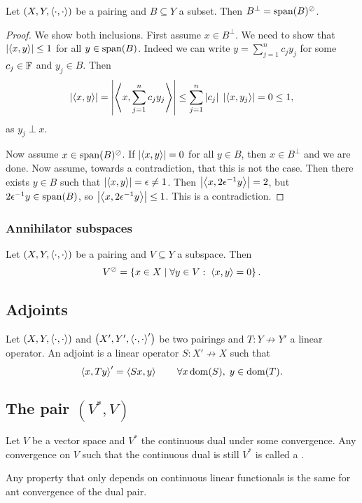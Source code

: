 \begin{proposition}
Let $\left( X,Y,\left\langle \cdot,\cdot \right\rangle \right)$ be a pairing and $B\subseteq Y$ a subset. Then $B^\perp = \operatorname{span}(B)^\oslash$.
\end{proposition}
\begin{proof}
We show both inclusions. First assume $x\in B^\perp$. We need to show that $\left|\left\langle x,y \right\rangle\right| \leq 1$ for all $y\in \operatorname{span}(B)$. Indeed we can write $y = \sum_{j=1}^n c_jy_j$ for some $c_j\in\mathbb{F}$ and $y_j\in B$. Then
\[ \left|\left\langle x,y \right\rangle\right| = \left|\left\langle x, \sum_{j=1}^n c_jy_j \right\rangle\right| \leq \sum_{j=1}^n |c_j|\;\left|\left\langle x, y_j \right\rangle\right| = 0 \leq 1, \]
as $y_j\perp x$.

Now assume $x\in \operatorname{span}(B)^\oslash$. If $\left|\left\langle x,y \right\rangle\right| = 0$ for all $y\in B$, then $x\in B^\perp$ and we are done. Now assume, towards a contradiction, that this is not the case. Then there exists $y\in B$ such that $\left|\left\langle x,y \right\rangle\right| = \epsilon \neq 1$. Then $\left|\left\langle x,2\epsilon^{-1}y \right\rangle\right| = 2$, but $2\epsilon^{-1}y\in\operatorname{span}(B)$, so $\left|\left\langle x,2\epsilon^{-1}y \right\rangle\right| \leq 1$. This is a contradiction.
\end{proof}

\subsubsection{Annihilator subspaces}
\begin{lemma}
Let $\left( X,Y,\left\langle \cdot,\cdot \right\rangle \right)$ be a pairing and $V\subseteq Y$ a subspace. Then
\[ V^{\oslash} = \left\{ x\in X \;\middle|\; \forall y\in V:\;\left\langle x,y \right\rangle = 0 \right\}. \]
\end{lemma}

\subsection{Adjoints}
\begin{definition}
Let $\left( X,Y,\left\langle \cdot,\cdot \right\rangle \right)$ and $\left( X',Y',\left\langle \cdot,\cdot \right\rangle' \right)$ be two pairings and $T: Y\not\to Y'$ a linear operator. An adjoint is a linear operator $S: X'\not\to X$ such that
\[ \left\langle x, Ty \right\rangle' = \left\langle Sx, y \right\rangle \qquad \forall x\operatorname{dom}(S), \; y\in\operatorname{dom}(T). \]
\end{definition}


\subsection{The pair $(V^*, V)$}
\begin{definition}
Let $V$ be a vector space and $V^*$ the continuous dual under some convergence. Any convergence on $V$ such that the continuous dual is still $V^*$ is called a .
\end{definition}
Any property that only depends on continuous linear functionals is the same for ant convergence of the dual pair.

